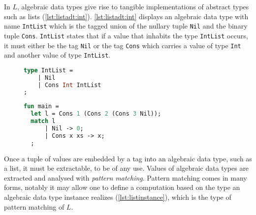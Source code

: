 \documentclass[11pt,oneside,a4paper]{report}
\begin{document}
In $L$, algebraic data types give rise to tangible implementations of abstract types such as lists (\autoref{lst:listadt:int}).
\autoref{lst:listadt:int} displays an algebraic data type with name \texttt{IntList} which is the tagged union of the nullary tuple \texttt{Nil} and the binary tuple \texttt{Cons}.
\texttt{IntList} states that if a value that inhabits the type \texttt{IntList} occurs, it must either be the tag \texttt{Nil} or the tag \texttt{Cons} which carries a value of type \texttt{Int} and another value of type \texttt{IntList}.
\begin{figure}
\begin{lstlisting}[language=ML,caption={List algebraic data type},label={lst:listadt:int}]
type IntList = 
    | Nil
    | Cons Int IntList
;
\end{lstlisting}
\end{figure}
\begin{figure}
\begin{lstlisting}[language=ML,caption={List instance and match},label={lst:listinstance}]
fun main =
  let l = Cons 1 (Cons 2 (Cons 3 Nil));
  match l 
      | Nil -> 0;
      | Cons x xs -> x;
  ;
\end{lstlisting}
\end{figure}
Once a tuple of values are embedded by a tag into an algebraic data type, such as a list, it must be extractable, to be of any use.
Values of algebraic data types are extracted and analysed with \textit{pattern matching}.
Pattern matching comes in many forms, notably it may allow one to define a computation based on the type an algebraic data type instance realizes (\autoref{lst:listinstance}), which is the type of pattern matching of $L$.
\end{document}
